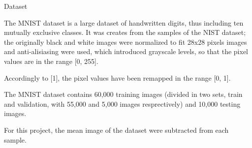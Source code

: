 \begin{tframe}{Dataset}

The MNIST dataset is a large dataset of handwritten digits, thus including ten mutually exclusive classes. It was creates from the samples of the NIST dataset; the originally black and white images were normalized to fit 28x28 pixels images and anti-alisiasing were used, which introduced grayscale levels, so that the pixel values are in the range [0, 255].

\vspace{0.1in}

Accordingly to [1], the pixel values have been remapped in the range [0, 1].

\vspace{0.1in}

The MNIST dataset contains 60,000 training images (divided in two sets, train and validation, with 55,000 and 5,000 images resprectively) and 10,000 testing images.

\vspace{0.1in}

For this project, the mean image of the dataset were subtracted from each sample.

\end{tframe}
